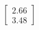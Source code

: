 \documentclass[preview]{standalone}
\begin{document}
\begin{align*}
\begin{bmatrix} 2.66 \\ 3.48 \end{bmatrix}
\end{align*}
\end{document}
